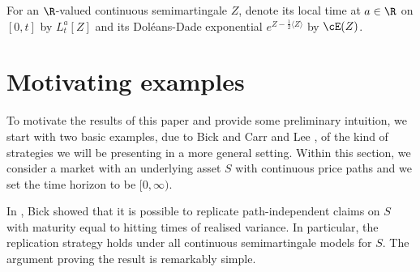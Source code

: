 \documentclass[11pt]{article}
\begin{document}
\begin{notation}
For an $\R$-valued continuous semimartingale $Z$, denote its local time at $a \in \R$ on $[0,t]$ by $L^a_t[Z]$ and its Dol\'eans-Dade exponential $e^{Z - \frac{1}{2} \langle Z \rangle}$ by $\cE(Z)$.

\end{notation}

\section{Motivating examples}
\label{section: motivating examples}

To motivate the results of this paper and provide some preliminary intuition, we start with two basic examples, due to Bick \cite{Bick} and Carr and Lee \cite{Carr-Lee:semimartingales}, of the kind of strategies we will be presenting in a more general setting. Within this section, we consider a market with an underlying asset $S$ with continuous price paths and we set the time horizon to be $[0,\infty)$.
 
In \cite{Bick}, Bick showed that it is possible to replicate path-independent claims on $S$ with maturity equal to hitting times of realised variance. In particular, the replication strategy holds under all continuous semimartingale models for $S$. The argument proving the result is remarkably simple.
\end{document}
